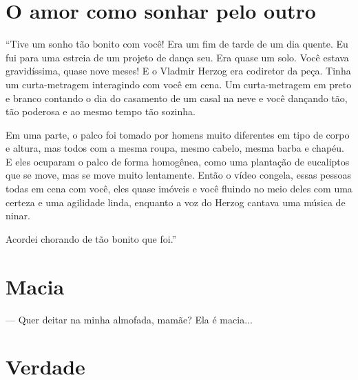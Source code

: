 \chapter{O amor como sonhar pelo outro}

``Tive um sonho tão bonito com você! Era um fim de tarde de um dia
quente. Eu fui para uma estreia de um projeto de dança seu. Era quase um
solo. Você estava gravidíssima, quase nove meses! E o Vladmir Herzog era
codiretor da peça. Tinha um curta-metragem interagindo com você em cena.
Um curta-metragem em preto e branco contando o dia do casamento de um
casal na neve e você dançando tão, tão poderosa e ao mesmo tempo tão
sozinha.

Em uma parte, o palco foi tomado por homens muito diferentes em tipo de
corpo e altura, mas todos com a mesma roupa, mesmo cabelo, mesma barba e
chapéu. E eles ocuparam o palco de forma homogênea, como uma plantação
de eucaliptos que se move, mas se move muito lentamente. Então o vídeo
congela, essas pessoas todas em cena com você, eles quase imóveis e você
fluindo no meio deles com uma certeza e uma agilidade linda, enquanto a
voz do Herzog cantava uma música de ninar.

Acordei chorando de tão bonito que foi.''

\chapter{Macia}\label{macia}


--- Quer deitar na minha almofada, mamãe? Ela é macia...

\chapter{Verdade}\label{verdade}

